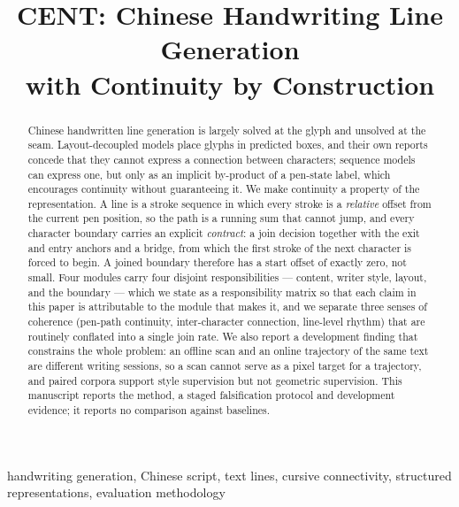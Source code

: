 \documentclass[conference]{IEEEtran}
\begin{document}
\title{CENT: Chinese Handwriting Line Generation\\with Continuity by Construction}

\author{
}

\maketitle

\begin{abstract}
Chinese handwritten line generation is largely solved at the glyph and unsolved at the seam.
Layout-decoupled models place glyphs in predicted boxes, and their own reports concede that
they cannot express a connection between characters; sequence models can express one, but only
as an implicit by-product of a pen-state label, which encourages continuity without guaranteeing
it. We make continuity a property of the representation. A line is a stroke sequence in which
every stroke is a \emph{relative} offset from the current pen position, so the path is a running
sum that cannot jump, and every character boundary carries an explicit \emph{contract}: a join
decision together with the exit and entry anchors and a bridge, from which the first stroke of
the next character is forced to begin. A joined boundary therefore has a start offset of exactly
zero, not small. Four modules carry four disjoint responsibilities --- content, writer style,
layout, and the boundary --- which we state as a responsibility matrix so that each claim in this
paper is attributable to the module that makes it, and we separate three senses of coherence
(pen-path continuity, inter-character connection, line-level rhythm) that are routinely
conflated into a single join rate. We also report a development finding that constrains the
whole problem: an offline scan and an online trajectory of the same text are different writing
sessions, so a scan cannot serve as a pixel target for a trajectory, and paired corpora support
style supervision but not geometric supervision. This manuscript reports the method, a staged
falsification protocol and development evidence; it reports no comparison against baselines.
\end{abstract}

\begin{IEEEkeywords}
handwriting generation, Chinese script, text lines, cursive connectivity, structured
representations, evaluation methodology
\end{IEEEkeywords}
\end{document}
